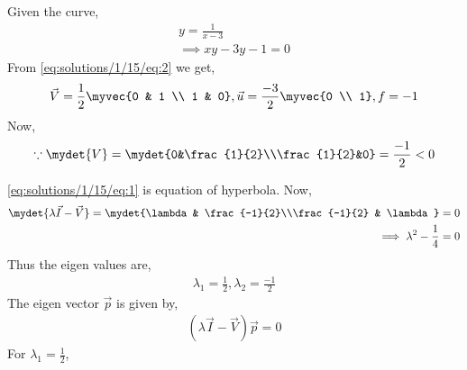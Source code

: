 Given the curve, 
\begin{align}
    y = \frac{1}{x-3} \label{eq:solutions/1/15/eq:1}\\ 
    \implies xy-3y-1 = 0 \label{eq:solutions/1/15/eq:2}
\end{align}
From \eqref{eq:solutions/1/15/eq:2} we get,  
\begin{align}
    \vec{V} = \frac{1}{2}\myvec{0 & 1 \\ 1 & 0}, \vec{u} = \frac{-3}{2}\myvec{0 \\ 1}, f=-1
\end{align}
Now, 
\begin{align}
    \because \mydet{V} = \mydet{0&\frac{1}{2}\\\frac{1}{2}&0} = \frac{-1}{2}<0
\end{align}

\eqref{eq:solutions/1/15/eq:1} is equation of hyperbola. Now, 
\begin{align}
    \mydet{\lambda\vec{I}-\vec{V}} = \mydet{\lambda & \frac{-1}{2}\\\frac{-1}{2} & \lambda}=0 \\
    \implies \lambda^2-\frac{1}{4} =0
\end{align}
Thus the eigen values are, 
\begin{align}
    \lambda_1 = \frac{1}{2}, \lambda_2 = \frac{-1}{2}
\end{align}
The eigen vector $\vec{p}$ is given by,
\begin{align}
    (\lambda\vec{I}-\vec{V})\vec{p}=0
\end{align}
For $\lambda_1 = \frac{1}{2}$,

